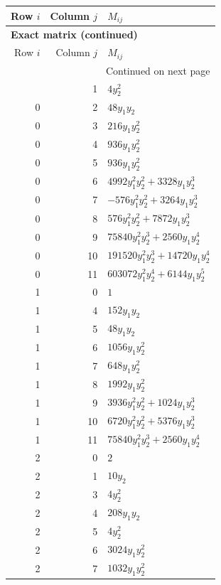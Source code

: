 \documentclass[10pt,a4paper]{article}
\begin{document}
{\small\setlength{\tabcolsep}{7pt}\begin{longtable}{rrp{125mm}}
\toprule Row $i$ & Column $j$ & $M_{ij}$\\\midrule\endfirsthead
\multicolumn{3}{l}{\textbf{Exact matrix (continued)}}\\
\toprule Row $i$ & Column $j$ & $M_{ij}$\\\midrule\endhead
\midrule\multicolumn{3}{r}{Continued on next page}\\\endfoot\bottomrule\endlastfoot
0 & 1 & $4 y_{2}^{2}$\\
0 & 2 & $48 y_{1} y_{2}$\\
0 & 3 & $216 y_{1} y_{2}^{2}$\\
0 & 4 & $936 y_{1} y_{2}^{2}$\\
0 & 5 & $936 y_{1} y_{2}^{2}$\\
0 & 6 & $4992 y_{1}^{2} y_{2}^{2} + 3328 y_{1} y_{2}^{3}$\\
0 & 7 & $- 576 y_{1}^{2} y_{2}^{2} + 3264 y_{1} y_{2}^{3}$\\
0 & 8 & $576 y_{1}^{2} y_{2}^{2} + 7872 y_{1} y_{2}^{3}$\\
0 & 9 & $75840 y_{1}^{2} y_{2}^{3} + 2560 y_{1} y_{2}^{4}$\\
0 & 10 & $191520 y_{1}^{2} y_{2}^{3} + 14720 y_{1} y_{2}^{4}$\\
0 & 11 & $603072 y_{1}^{2} y_{2}^{4} + 6144 y_{1} y_{2}^{5}$\\
1 & 0 & $1$\\
1 & 4 & $152 y_{1} y_{2}$\\
1 & 5 & $48 y_{1} y_{2}$\\
1 & 6 & $1056 y_{1} y_{2}^{2}$\\
1 & 7 & $648 y_{1} y_{2}^{2}$\\
1 & 8 & $1992 y_{1} y_{2}^{2}$\\
1 & 9 & $3936 y_{1}^{2} y_{2}^{2} + 1024 y_{1} y_{2}^{3}$\\
1 & 10 & $6720 y_{1}^{2} y_{2}^{2} + 5376 y_{1} y_{2}^{3}$\\
1 & 11 & $75840 y_{1}^{2} y_{2}^{3} + 2560 y_{1} y_{2}^{4}$\\
2 & 0 & $2$\\
2 & 1 & $10 y_{2}$\\
2 & 3 & $4 y_{2}^{2}$\\
2 & 4 & $208 y_{1} y_{2}$\\
2 & 5 & $4 y_{2}^{2}$\\
2 & 6 & $3024 y_{1} y_{2}^{2}$\\
2 & 7 & $1032 y_{1} y_{2}^{2}$\\

\end{longtable}}
\end{document}
